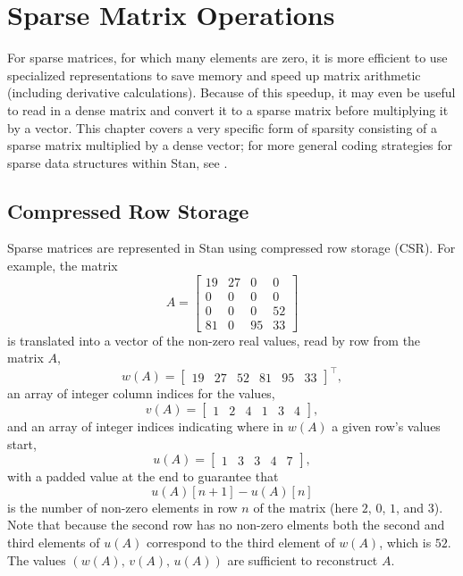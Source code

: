\chapter{Sparse Matrix Operations}\label{sparse-matrices.chapter}

\noindent
For sparse matrices, for which many elements are zero, it is more
efficient to use specialized representations to save memory and speed
up matrix arithmetic (including derivative calculations).  Because of
this speedup, it may even be useful to read in a dense matrix and convert
it to a sparse matrix before multiplying it by a vector.  This chapter
covers a very specific form of sparsity consisting of a sparse matrix
multiplied by a dense vector;  for more general coding strategies for
sparse data structures within Stan, see .

\section{Compressed Row Storage}\label{CSR.section}

Sparse matrices are represented in Stan using compressed row storage
(CSR).  For example, the matrix
\[
A = 
\begin{bmatrix}
19 & 27 & 0 & 0 
\\ 
0 & 0 & 0 & 0 
\\
0 & 0 & 0 & 52
\\
81 & 0 & 95 & 33
\end{bmatrix}
\]
is translated into a vector of the non-zero real values, read by row
from the matrix $A$,
\[
w(A) =
\begin{bmatrix}
19 & 27 & 52 & 81 & 95 & 33
\end{bmatrix}^{\top} \! \! \! ,
\]
an array of integer column indices for the values,
\[
v(A) = 
\begin{bmatrix}
1 & 2 & 4 & 1 & 3 & 4
\end{bmatrix} \! ,
\]
and an array of integer indices indicating where in $w(A)$ a given row's
values start,
\[
u(A) = 
\begin{bmatrix}
1 & 3 & 3 & 4 & 7
\end{bmatrix} \! ,
\]
with a padded value at the end to guarantee that 
\[
u(A)[n+1] - u(A)[n]
\]
is the number of non-zero elements in row $n$ of the matrix (here $2$, $0$,
$1$, and $3$). Note that because the second row has no non-zero elments both
the second and third elements of $u(A)$ correspond to the third element of
$w(A)$, which is $52$. The values $(w(A), \, v(A), \, u(A))$ are sufficient 
to reconstruct $A$.

